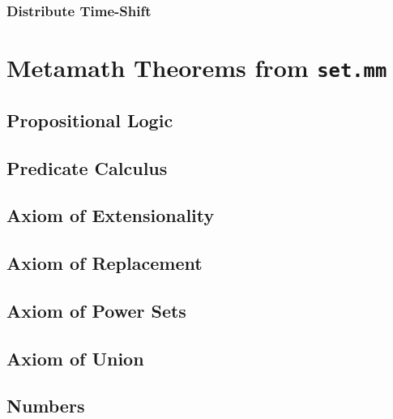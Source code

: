 \documentclass[fleqn,openany]{book}
\begin{document}
\subsection{Distribute Time-Shift}
\allowdisplaybreaks{

}  %

\chapter{Metamath Theorems from  \texttt{set.mm}}\label{chapter:mm}

\section{Propositional Logic}\label{sec:prop}


\section{Predicate Calculus}\label{sec:predicatecalc}


\section{Axiom of Extensionality}\label{sec:extensionality}


\section{Axiom of Replacement}\label{sec:replacement}


\section{Axiom of Power Sets}\label{sec:axpowerset}


\section{Axiom of Union}\label{sec:axunion}


\section{Numbers}\label{sec:mmnumbers}

\end{document}
